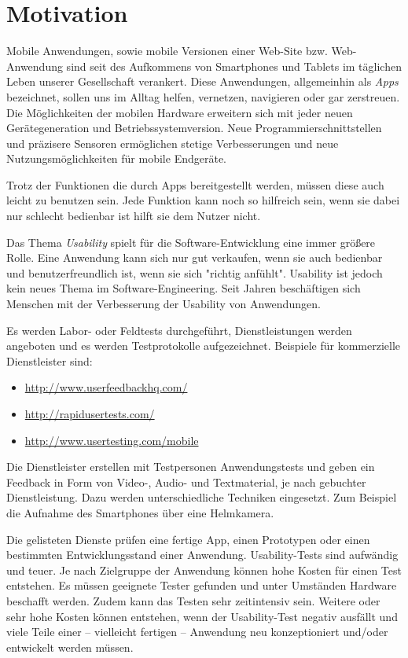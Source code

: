\section{Motivation}
\label{motivation}

Mobile Anwendungen, sowie mobile Versionen einer Web-Site bzw. Web-Anwendung sind seit des Aufkommens von Smartphones und Tablets im täglichen Leben unserer Gesellschaft verankert. 
Diese Anwendungen, allgemeinhin als \textit{Apps} bezeichnet, sollen uns im Alltag helfen, vernetzen, navigieren oder gar zerstreuen. 
Die Möglichkeiten der mobilen Hardware erweitern sich mit jeder neuen Gerätegeneration und Betriebssystemversion. 
Neue Programmierschnittstellen und präzisere Sensoren ermöglichen stetige Verbesserungen und neue Nutzungsmöglichkeiten für mobile Endgeräte. 

Trotz der Funktionen die durch Apps bereitgestellt werden, müssen diese auch leicht zu benutzen sein. 
Jede Funktion kann noch so hilfreich sein, wenn sie dabei nur schlecht bedienbar ist hilft sie dem Nutzer nicht.

Das Thema \textit{Usability} spielt für die Software-Entwicklung eine immer größere Rolle. 
Eine Anwendung kann sich nur gut verkaufen, wenn sie auch bedienbar und benutzerfreundlich ist, wenn sie sich "richtig anfühlt". 
Usability ist jedoch kein neues Thema im Software-Engineering.
Seit Jahren beschäftigen sich Menschen mit der Verbesserung der Usability von Anwendungen.

Es werden Labor- oder Feldtests durchgeführt, Dienstleistungen werden angeboten und es werden Testprotokolle aufgezeichnet. Beispiele für kommerzielle Dienstleister sind: 

\begin{itemize}
    \item{\url{http://www.userfeedbackhq.com/}}
    \item{\url{http://rapidusertests.com/}}
    \item{\url{http://www.usertesting.com/mobile}}
\end{itemize}

Die Dienstleister erstellen mit Testpersonen Anwendungstests und geben ein Feedback in Form von Video-, Audio- und Textmaterial, je nach gebuchter Dienstleistung. 
Dazu werden unterschiedliche Techniken eingesetzt. 
Zum Beispiel die Aufnahme des Smartphones über eine Helmkamera. \cite[vgl.]{usabilityblog_wasBeachten}

Die gelisteten Dienste prüfen eine fertige App, einen Prototypen oder einen bestimmten Entwicklungsstand einer Anwendung. 
Usability-Tests sind aufwändig und teuer. 
Je nach Zielgruppe der Anwendung können hohe Kosten für einen Test entstehen. 
Es müssen geeignete Tester gefunden und unter Umständen Hardware beschafft werden. 
Zudem kann das Testen sehr zeitintensiv sein. 
Weitere oder sehr hohe Kosten können entstehen, wenn der Usability-Test negativ ausfällt und viele Teile einer -- vielleicht fertigen -- Anwendung neu konzeptioniert und/oder entwickelt werden müssen. 

